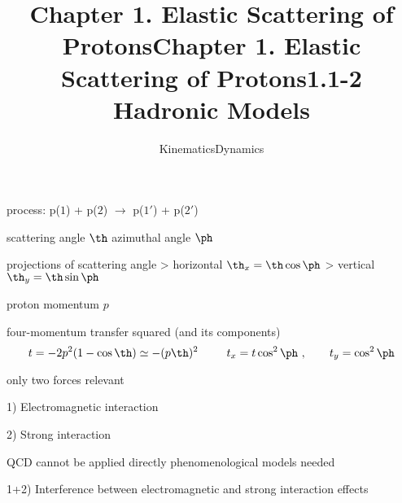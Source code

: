 

\newpage%
\title{Chapter 1. Elastic Scattering of Protons}
\vskip-3mm
\subtitle{Kinematics}

\> process: p($1$) + p($2$) $\longrightarrow$ p($1'$) + p($2'$)


\> scattering angle $\th$
\> azimuthal angle $\ph$

\> projections of scattering angle
\>> horizontal $\th_x = \th \cos\ph$
\>> vertical $\th_y = \th \sin\ph$

\> proton momentum $p$

\> four-momentum transfer squared (and its components)
$$t = -2p^2 (1 - \cos\th) \simeq -(p\th)^2\ \,\qquad t_x = t \cos^2\ph\ ,\qquad t_y = \cos^2\ph$$

\newpage%
\title{Chapter 1. Elastic Scattering of Protons}
\vskip-3mm
\subtitle{Dynamics}

\> only two forces relevant

{

\vfil
\noindent \cmyk{\TitColor}1) Electromagnetic interaction\cmyk{\FgColor}


\vfil
\noindent \cmyk{\TitColor}2) Strong interaction\cmyk{\FgColor}

\> QCD cannot be applied directly
\> phenomenological models needed

\vfil
\noindent \cmyk{\TitColor}1+2) Interference between electromagnetic and strong interaction effects\cmyk{\FgColor}

}

\newpage%
\title{1.1-2 Hadronic Models}


